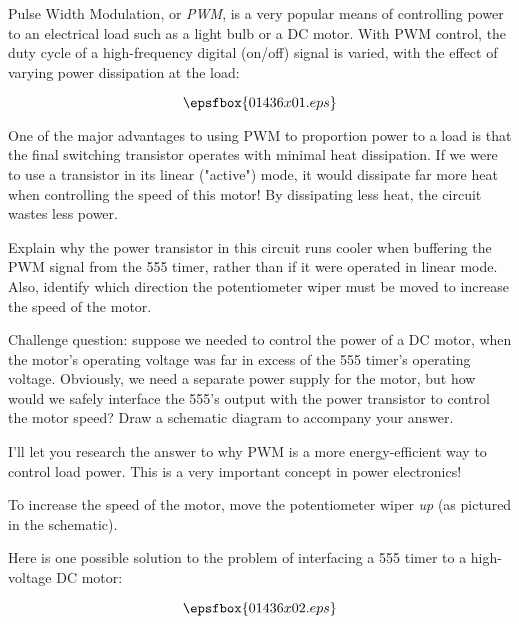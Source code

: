 

Pulse Width Modulation, or {\it PWM}, is a very popular means of controlling power to an electrical load such as a light bulb or a DC motor.  With PWM control, the duty cycle of a high-frequency digital (on/off) signal is varied, with the effect of varying power dissipation at the load:

$$\epsfbox{01436x01.eps}$$

One of the major advantages to using PWM to proportion power to a load is that the final switching transistor operates with minimal heat dissipation.  If we were to use a transistor in its linear ("active") mode, it would dissipate far more heat when controlling the speed of this motor!  By dissipating less heat, the circuit wastes less power.

Explain why the power transistor in this circuit runs cooler when buffering the PWM signal from the 555 timer, rather than if it were operated in linear mode.  Also, identify which direction the potentiometer wiper must be moved to increase the speed of the motor.

\vskip 10pt

Challenge question: suppose we needed to control the power of a DC motor, when the motor's operating voltage was far in excess of the 555 timer's operating voltage.  Obviously, we need a separate power supply for the motor, but how would we safely interface the 555's output with the power transistor to control the motor speed?  Draw a schematic diagram to accompany your answer.







I'll let you research the answer to why PWM is a more energy-efficient way to control load power.  This is a very important concept in power electronics!

To increase the speed of the motor, move the potentiometer wiper {\it up} (as pictured in the schematic).

\vskip 10pt

Here is one possible solution to the problem of interfacing a 555 timer to a high-voltage DC motor:

$$\epsfbox{01436x02.eps}$$

